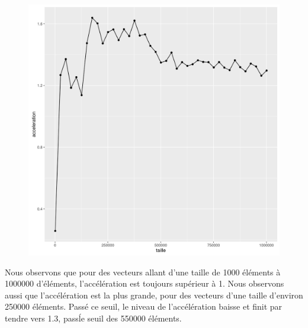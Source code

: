 \documentclass[a4paper,11pt]{scrartcl}
\begin{document}
\begin{figure}[H] \center
   \includegraphics[scale=0.5] {graphes/global_temps_machine_accel10.png}
\end{figure}

Nous observons que pour des vecteurs allant d'une taille de 1000 \'el\'ements \`a 1000000 d'\'el\'ements, l'acc\'el\'eration est toujours sup\'erieur \`a 1. Nous observons aussi que l'acc\'el\'eration est la plus grande, pour des vecteurs d'une taille d'environ 250000 \'el\'ements. Pass\'e ce seuil, le niveau de l'acc\'el\'eration baisse et finit par tendre vers 1.3, pass\' le seuil des 550000 \'el\'ements.   
\end{document}
